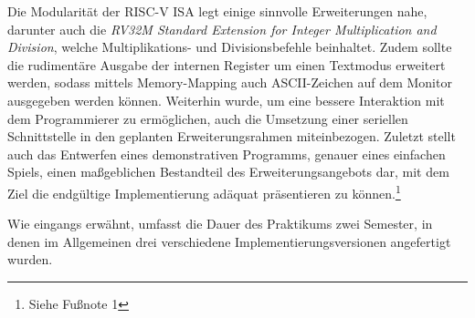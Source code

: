 Die Modularit\"at der RISC-V ISA legt einige sinnvolle Erweiterungen nahe,
darunter auch die
\textit{RV32M Standard Extension for Integer Multiplication and Division},
welche Multiplikations- und Divisionsbefehle beinhaltet. Zudem sollte die
rudiment\"are Ausgabe der internen Register um einen Textmodus erweitert
werden, sodass mittels Memory-Mapping auch ASCII-Zeichen auf dem Monitor
ausgegeben werden k\"onnen. Weiterhin wurde, um eine bessere Interaktion mit
dem Programmierer zu erm\"oglichen, auch die Umsetzung einer seriellen
Schnittstelle in den geplanten Erweiterungsrahmen miteinbezogen. Zuletzt
stellt auch das Entwerfen eines demonstrativen Programms, genauer eines
einfachen Spiels, einen ma\ss{}geblichen Bestandteil des Erweiterungsangebots
dar, mit dem Ziel die endg\"ultige Implementierung ad\"aquat pr\"asentieren zu k\"onnen.\footnote{Siehe Fu\ss{}note 1}

Wie eingangs erw\"ahnt, umfasst die Dauer des Praktikums zwei Semester, in
denen im Allgemeinen drei verschiedene Implementierungsversionen angefertigt
wurden.

